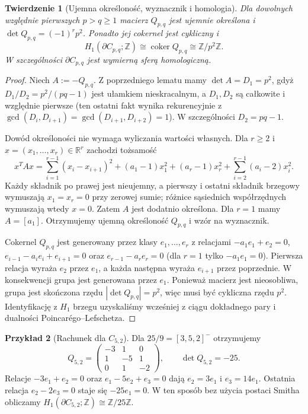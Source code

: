 \documentclass[11pt,a4paper]{report}
\numberwithin{equation}{section}
\theoremstyle{plain}
\newtheorem{twierdzenie}{Twierdzenie}[section]
\theoremstyle{definition}
\newtheorem{przyklad}[twierdzenie]{Przykład}
\theoremstyle{remark}
\begin{document}
\begin{twierdzenie}[Ujemna określoność, wyznacznik i homologia]
\label{thm:tg-general-algebra}
Dla dowolnych względnie pierwszych $p>q\geq1$ macierz
$Q_{p,q}$ jest ujemnie określona i
$\det Q_{p,q}=(-1)^r p^2$.
Ponadto jej cokernel jest cykliczny i
\[
H_1(\partial C_{p,q};\mathbb Z)
\cong\operatorname{coker}Q_{p,q}
\cong\mathbb Z/p^2\mathbb Z.
\]
W szczególności $\partial C_{p,q}$ jest wymierną sferą
homologiczną.
\end{twierdzenie}

\begin{proof}
Niech $A:=-Q_{p,q}$. Z poprzedniego lematu mamy
$\det A=D_1=p^2$, gdyż
$D_1/D_2=p^2/(pq-1)$ jest ułamkiem nieskracalnym,
a $D_1,D_2$ są całkowite i względnie pierwsze
(ten ostatni fakt wynika rekurencyjnie z
$\gcd(D_i,D_{i+1})=\gcd(D_{i+1},D_{i+2})=1$).
W szczególności $D_2=pq-1$.

Dowód określoności nie wymaga wyliczania wartości własnych.
Dla $r\geq2$ i $x=(x_1,\ldots,x_r)\in\mathbb R^r$
zachodzi tożsamość
\[
x^TAx=\sum_{i=1}^{r-1}(x_i-x_{i+1})^2
+(a_1-1)x_1^2+(a_r-1)x_r^2
+\sum_{i=2}^{r-1}(a_i-2)x_i^2.
\]
Każdy składnik po prawej jest nieujemny, a pierwszy i ostatni
składnik brzegowy wymuszają $x_1=x_r=0$ przy zerowej sumie;
różnice sąsiednich współrzędnych wymuszają wtedy $x=0$.
Zatem $A$ jest dodatnio określona. Dla $r=1$ mamy $A=[a_1]$.
Otrzymujemy ujemną określoność $Q_{p,q}$ i wzór na wyznacznik.

Cokernel $Q_{p,q}$ jest generowany przez klasy
$e_1,\ldots,e_r$ z relacjami
$-a_1e_1+e_2=0$, $e_{i-1}-a_ie_i+e_{i+1}=0$
oraz $e_{r-1}-a_re_r=0$ (dla $r=1$ tylko
$-a_1e_1=0$). Pierwsza relacja wyraża $e_2$ przez $e_1$,
a każda następna wyraża $e_{i+1}$ przez poprzednie.
W konsekwencji grupa jest generowana przez $e_1$.
Ponieważ macierz jest nieosobliwa, grupa jest skończona rzędu
$|\det Q_{p,q}|=p^2$, więc musi być cykliczna rzędu $p^2$.
Identyfikację z $H_1$ brzegu uzyskaliśmy wcześniej z
ciągu dokładnego pary i dualności Poincarégo--Lefschetza.
\end{proof}

\begin{przyklad}[Rachunek dla $C_{5,2}$]
Dla $25/9=[3,5,2]^-$ otrzymujemy
\[
Q_{5,2}=\begin{pmatrix}-3&1&0\\1&-5&1\\0&1&-2\end{pmatrix},
\qquad\det Q_{5,2}=-25.
\]
Relacje $-3e_1+e_2=0$ oraz
$e_1-5e_2+e_3=0$ dają $e_2=3e_1$ i $e_3=14e_1$.
Ostatnia relacja $e_2-2e_3=0$ staje się
$-25e_1=0$. W ten sposób bez użycia postaci Smitha
obliczamy $H_1(\partial C_{5,2};\mathbb Z)\cong\mathbb Z/25\mathbb Z$.
\end{przyklad}
\end{document}
